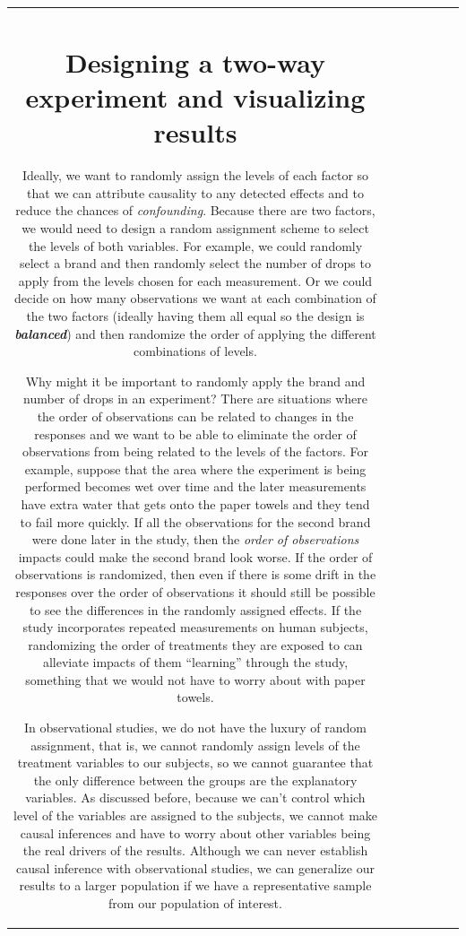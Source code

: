 \documentclass[]{book}
\theoremstyle{definition}
\theoremstyle{definition}
\theoremstyle{remark}
\begin{document}
\begin{longtable}[]{@{}ccccccc@{}}
\begin{minipage}[b]{0.10\columnwidth}
\section{Designing a two-way experiment and visualizing
results}\label{section4-2}

Ideally, we want to randomly assign the levels of each factor so that we
can attribute causality to any detected effects and to reduce the
chances of \emph{confounding}. Because there are two factors, we would
need to design a random assignment scheme to select the levels of both
variables. For example, we could randomly select a brand and then
randomly select the number of drops to apply from the levels chosen for
each measurement. Or we could decide on how many observations we want at
each combination of the two factors (ideally having them all equal so
the design is \textbf{\emph{balanced}}) and then randomize the order of
applying the different combinations of levels.

Why might it be important to randomly apply the brand and number of
drops in an experiment? There are situations where the order of
observations can be related to changes in the responses and we want to
be able to eliminate the order of observations from being related to the
levels of the factors. For example, suppose that the area where the
experiment is being performed becomes wet over time and the later
measurements have extra water that gets onto the paper towels and they
tend to fail more quickly. If all the observations for the second brand
were done later in the study, then the \emph{order of observations}
impacts could make the second brand look worse. If the order of
observations is randomized, then even if there is some drift in the
responses over the order of observations it should still be possible to
see the differences in the randomly assigned effects. If the study
incorporates repeated measurements on human subjects, randomizing the
order of treatments they are exposed to can alleviate impacts of them
``learning'' through the study, something that we would not have to
worry about with paper towels.

In observational studies, we do not have the luxury of random
assignment, that is, we cannot randomly assign levels of the treatment
variables to our subjects, so we cannot guarantee that the only
difference between the groups are the explanatory variables. As
discussed before, because we can't control which level of the variables
are assigned to the subjects, we cannot make causal inferences and have
to worry about other variables being the real drivers of the results.
Although we can never establish causal inference with observational
studies, we can generalize our results to a larger population if we have
a representative sample from our population of interest.


\end{minipage}
\end{longtable}
\end{document}
